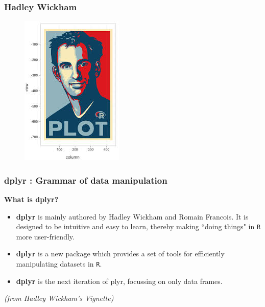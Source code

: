 \documentclass{beamer}
\begin{document}
	\begin{frame}
	\frametitle{Hadley Wickham}
	\begin{figure}
\centering
\includegraphics[width=0.5\linewidth]{HWgraphic}
\end{figure}

	\end{frame}

	
	\begin{frame}[fragile]
		\frametitle{dplyr : Grammar of data manipulation}
		\Large
		\textbf{What is dplyr?}
		\begin{itemize}
			\item \textbf{dplyr} is mainly authored by Hadley Wickham and Romain Francois. It is designed to be intuitive and easy to learn, thereby making ``doing things" in \texttt{R} more user-friendly.
			\item \textbf{dplyr} is a new package which provides a set of tools for efficiently manipulating datasets in \texttt{R}.
			\item \textbf{dplyr} is the next iteration of plyr, focussing on only data frames. 
		\end{itemize}\smallskip
		\textit{(from Hadley Wickham's Vignette)}
	\end{frame}
	
\end{document}
